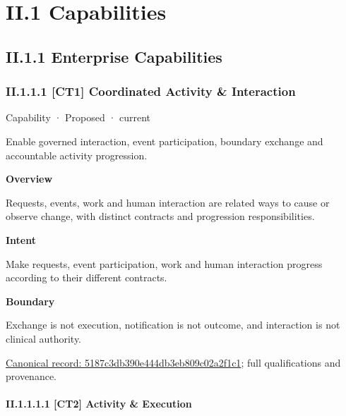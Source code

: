 \chapter*{II.1 Capabilities}
\label{navigation:II.1}

\section*{II.1.1 Enterprise Capabilities}
\label{navigation:II.1.1}

\subsection*{II.1.1.1 [CT1] Coordinated Activity \& Interaction}
\label{navigation:II.1.1.1}

\label{element:5187c3db390e444db3eb809c02a2f1c1}
{\small Capability · Proposed · current}\par

Enable governed interaction, event participation, boundary exchange and accountable activity progression.



\textbf{Overview}



Requests, events, work and human interaction are related ways to cause or observe change, with distinct contracts and progression responsibilities.



\textbf{Intent}



Make requests, event participation, work and human interaction progress according to their different contracts.



\textbf{Boundary}



Exchange is not execution, notification is not outcome, and interaction is not clinical authority.


{\footnotesize \href{../../../../continuum/strategy/capability/5187c3db390e444db3eb809c02a2f1c1.md}{Canonical record: 5187c3db390e444db3eb809c02a2f1c1}; full qualifications and provenance.}\par
\subsubsection*{II.1.1.1.1 [CT2] Activity \& Execution}
\label{navigation:II.1.1.1.1}

